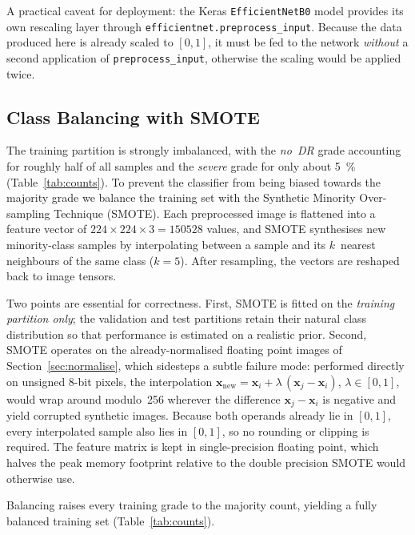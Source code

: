 \documentclass[11pt,a4paper]{article}
\begin{document}
A practical caveat for deployment: the Keras \texttt{EfficientNetB0} model
provides its own rescaling layer through
\texttt{efficientnet.preprocess\_input}. Because the data produced here is
already scaled to $[0,1]$, it must be fed to the network \emph{without} a
second application of \texttt{preprocess\_input}, otherwise the scaling would
be applied twice.

\subsection{Class Balancing with SMOTE}
\label{sec:smote}

The training partition is strongly imbalanced, with the \emph{no~DR} grade
accounting for roughly half of all samples and the \emph{severe} grade for
only about \SI{5}{\percent} (Table~\ref{tab:counts}). To prevent the
classifier from being biased towards the majority grade we balance the
training set with the Synthetic Minority Over-sampling Technique (SMOTE).
Each preprocessed image is flattened into a feature vector of
$224\times224\times3 = \num{150528}$ values, and SMOTE synthesises new
minority-class samples by interpolating between a sample and its
$k$~nearest neighbours of the same class ($k=5$). After resampling, the
vectors are reshaped back to image tensors.

Two points are essential for correctness. First, SMOTE is fitted on the
\emph{training partition only}; the validation and test partitions retain
their natural class distribution so that performance is estimated on a
realistic prior. Second, SMOTE operates on the already-normalised floating
point images of Section~\ref{sec:normalise}, which sidesteps a subtle failure
mode: performed directly on unsigned 8-bit pixels, the interpolation
$\mathbf{x}_{\text{new}} = \mathbf{x}_i + \lambda\,(\mathbf{x}_j - \mathbf{x}_i)$,
$\lambda \in [0,1]$, would wrap around modulo~256 wherever the difference
$\mathbf{x}_j - \mathbf{x}_i$ is negative and yield corrupted synthetic images.
Because both operands already lie in $[0,1]$, every interpolated sample also
lies in $[0,1]$, so no rounding or clipping is required. The feature matrix is
kept in single-precision floating point, which halves the peak memory footprint
relative to the double precision SMOTE would otherwise use.

Balancing raises every training grade to the majority count, yielding a fully
balanced training set (Table~\ref{tab:counts}).
\end{document}
